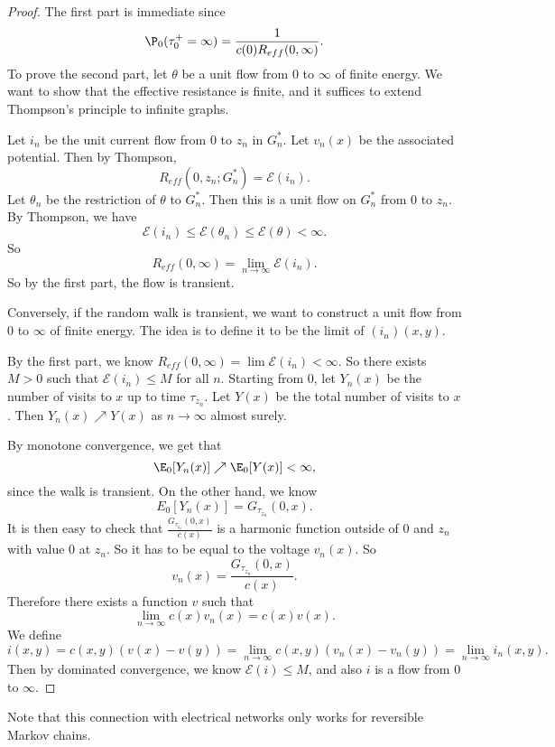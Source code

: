 \documentclass[a4paper]{article}
\begin{document}
\begin{proof}
  The first part is immediate since
  \[
    \P_0(\tau_0^+ = \infty) = \frac{1}{c(0) R_{eff}(0, \infty)}.
  \]
  To prove the second part, let $\theta$ be a unit flow from $0$ to $\infty$ of finite energy. We want to show that the effective resistance is finite, and it suffices to extend Thompson's principle to infinite graphs.

  Let $i_n$ be the unit current flow from $0$ to $z_n$ in $G_n^*$. Let $v_n(x)$ be the associated potential. Then by Thompson,
  \[
    R_{eff}(0, z_n; G_n^*) = \mathcal{E}(i_n).
  \]
  Let $\theta_n$ be the restriction of $\theta$ to $G_n^*$. Then this is a unit flow on $G_n^*$ from $0$ to $z_n$. By Thompson, we have
  \[
    \mathcal{E}(i_n) \leq \mathcal{E}(\theta_n) \leq \mathcal{E}(\theta) < \infty.
  \]
  So
  \[
    R_{eff}(0, \infty) = \lim_{n \to \infty} \mathcal{E}(i_n).
  \]
  So by the first part, the flow is transient.

  Conversely, if the random walk is transient, we want to construct a unit flow from $0$ to $\infty$ of finite energy. The idea is to define it to be the limit of $(i_n)(x, y)$.

  By the first part, we know $R_{eff}(0, \infty) = \lim \mathcal{E}(i_n) < \infty$. So there exists $M > 0$ such that $\mathcal{E}(i_n) \leq M$ for all $n$. Starting from $0$, let $Y_n(x)$ be the number of visits to $x$ up to time $\tau_{z_n}$. Let $Y(x)$ be the total number of visits to $x$. Then $Y_n(x) \nearrow Y(x)$ as $n \to \infty$ almost surely.

  By monotone convergence, we get that
  \[
    \E_0[Y_n(x)] \nearrow \E_0[Y(x)] < \infty,
  \]
  since the walk is transient. On the other hand, we know
  \[
    E_0[Y_n(x)] = G_{\tau_{z_n}}(0, x).
  \]
  It is then easy to check that $\frac{G_{\tau_{z_n}}(0, x)}{c(x)}$ is a harmonic function outside of $0$ and $z_n$ with value $0$ at $z_n$. So it has to be equal to the voltage $v_n(x)$. So
  \[
    v_n(x) = \frac{G_{\tau_{z_n}}(0, x)}{c(x)}.
  \]
  Therefore there exists a function $v$ such that
  \[
    \lim_{n \to \infty} c(x) v_n(x) = c(x) v(x).
  \]
  We define
  \[
    i(x, y) = c(x, y) (v(x) - v(y)) = \lim_{n \to \infty} c(x, y) (v_n(x) - v_n(y)) = \lim_{n \to \infty} i_n(x, y).
  \]
  Then by dominated convergence, we know $\mathcal{E}(i) \leq M$, and also $i$ is a flow from $0$ to $\infty$.
\end{proof}

Note that this connection with electrical networks only works for reversible Markov chains.
\end{document}
